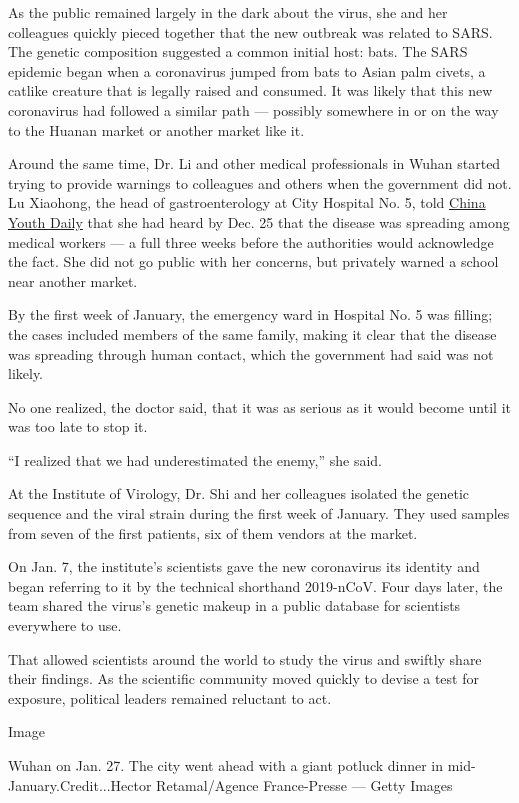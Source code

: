 As the public remained largely in the dark about the virus, she and her
colleagues quickly pieced together that the new outbreak was related to
SARS. The genetic composition suggested a common initial host: bats. The
SARS epidemic began when a coronavirus jumped from bats to Asian palm
civets, a catlike creature that is legally raised and consumed. It was
likely that this new coronavirus had followed a similar path ---
possibly somewhere in or on the way to the Huanan market or another
market like it.

Around the same time, Dr. Li and other medical professionals in Wuhan
started trying to provide warnings to colleagues and others when the
government did not. Lu Xiaohong, the head of gastroenterology at City
Hospital No. 5, told
\href{https://mp.weixin.qq.com/s/IzzCnz4Yr2jEIYZePiu_ow}{China Youth
Daily} that she had heard by Dec. 25 that the disease was spreading
among medical workers --- a full three weeks before the authorities
would acknowledge the fact. She did not go public with her concerns, but
privately warned a school near another market.

By the first week of January, the emergency ward in Hospital No. 5 was
filling; the cases included members of the same family, making it clear
that the disease was spreading through human contact, which the
government had said was not likely.

No one realized, the doctor said, that it was as serious as it would
become until it was too late to stop it.

``I realized that we had underestimated the enemy,'' she said.

At the Institute of Virology, Dr. Shi and her colleagues isolated the
genetic sequence and the viral strain during the first week of January.
They used samples from seven of the first patients, six of them vendors
at the market.

On Jan. 7, the institute's scientists gave the new coronavirus its
identity and began referring to it by the technical shorthand 2019-nCoV.
Four days later, the team shared the virus's genetic makeup in a public
database for scientists everywhere to use.

That allowed scientists around the world to study the virus and swiftly
share their findings. As the scientific community moved quickly to
devise a test for exposure, political leaders remained reluctant to act.

Image

Wuhan on Jan. 27. The city went ahead with a giant potluck dinner in
mid-January.Credit...Hector Retamal/Agence France-Presse --- Getty
Images

